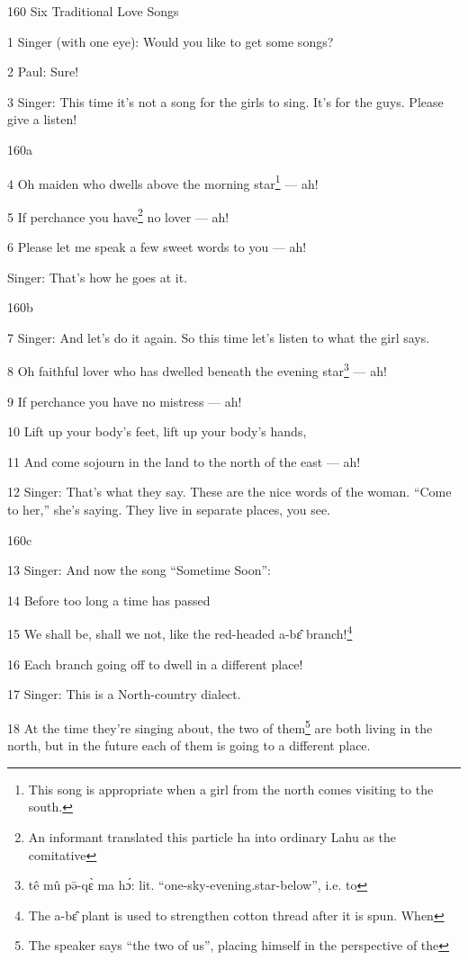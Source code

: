 
160 Six Traditional Love Songs

1 Singer (with one eye): Would you like to get some songs?

2 Paul: Sure!

3 Singer: This time it's not a song for the girls to sing. It's for the guys. Please
give a listen!

160a

4 Oh maiden who dwells above the morning star\footnote{This song is appropriate when a girl from the north comes visiting to the south.} --- ah!

5 If perchance you have\footnote{An informant translated this particle ha into ordinary Lahu as the comitative} no lover --- ah!

6 Please let me speak a few sweet words to you --- ah!

Singer: That's how he goes at it.

160b

7 Singer: And let's do it again. So this time let's listen to what the girl says.

8 Oh faithful lover who has dwelled beneath the evening star\footnote{tê mû pə̄-qɛ̀ ma hɔ́: lit. ``one-sky-evening.star-below'', i.e. to} --- ah!

9 If perchance you have no mistress --- ah!

10 Lift up your body's feet, lift up your body's hands,

11 And come sojourn in the land to the north of the east --- ah!

12 Singer: That's what they say. These are the nice words of the woman. ``Come
to her,'' she's saying. They live in separate places, you see.

160c

13 Singer: And now the song ``Sometime Soon'':

14 Before too long a time has passed

15 We shall be, shall we not, like the red-headed a-bɛ̂ branch!\footnote{The a-bɛ̂ plant is used to strengthen cotton thread after it is spun. When}

16 Each branch going off to dwell in a different place!

17 Singer: This is a North-country dialect.

18 At the time they're singing about, the two of them\footnote{The speaker says ``the two of us'', placing himself in the perspective of the} are both living in the
north, but in the future each of them is going to a different place.

